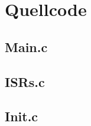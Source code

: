 \section{Quellcode}
\label{app:Quellcode}
\subsection{Main.c}

\subsection{ISRs.c}

\subsection{Init.c}
